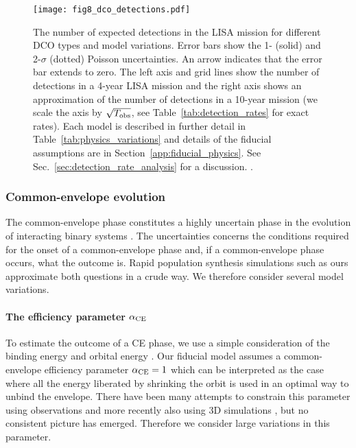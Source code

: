 \begin{figure*}[p]
    \centering
    \texttt{[image: fig8\_dco\_detections.pdf]}
    \caption{The number of expected detections in the LISA mission for different DCO types and model variations. Error bars show the 1- (solid) and 2-$\sigma$ (dotted) Poisson uncertainties. An arrow indicates that the error bar extends to zero. The left axis and grid lines show the number of detections in a 4-year LISA mission and the right axis shows an approximation of the number of detections in a 10-year mission (we scale the axis by $\sqrt{T_{\rm obs}}$, see Table~\ref{tab:detection_rates} for exact rates).  Each model is described in further detail in Table~\ref{tab:physics_variations} and details of the fiducial assumptions are in Section~\ref{app:fiducial_physics}. See Sec.~\ref{sec:detection_rate_analysis} for a discussion. \href{https://github.com/TomWagg/detecting-DCOs-in-LISA/blob/main/paper/figures/fig8_dco_detections.pdf}{\faFileImage} \href{https://github.com/TomWagg/detecting-DCOs-in-LISA/blob/main/paper/figure_notebooks/detections.ipynb}{\faBook}.}
    \label{fig:detection_rates}
\end{figure*}

\subsubsection{Common-envelope evolution}\label{sec:detection_rate_CE_trends}

The common-envelope phase constitutes a highly uncertain phase in the evolution of interacting binary systems \citep[e.g.][]{Ivanova+2013}. The uncertainties concerns the conditions required for the onset of a common-envelope phase and, if a common-envelope phase occurs, what the outcome is. Rapid population synthesis simulations such as ours approximate both questions in a crude way. We therefore consider several model variations. 

\paragraph{The efficiency parameter $\alpha_{\rm CE}$} To estimate the outcome of a CE phase, we use a simple consideration of the binding energy and orbital energy \citep{Webbink+1984, deKool+1990}. Our fiducial model assumes a common-envelope efficiency parameter $\alpha_{\rm CE} = 1$ which can be interpreted as the case where all the energy liberated by shrinking the orbit is used in an optimal way to unbind the envelope. There have been many attempts to constrain this parameter using observations and more recently also using 3D simulations \citep[e.g.][]{DeMarco+2011, Law-Smith+2020, Lau+2021}, but no consistent picture has emerged. Therefore we consider large variations in this parameter. 

